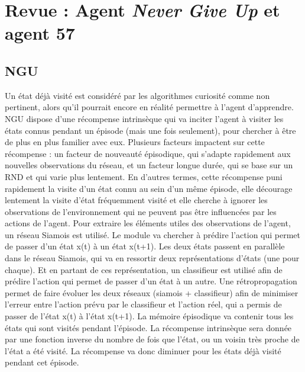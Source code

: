 \documentclass[a4paper,12pt]{report}
\begin{document}
\newpage \section{Revue : Agent \textit{Never Give Up} \cite{ngu} et agent 57 \cite{agent57}}
\subsection{NGU}
Un état déjà visité est considéré par les algorithmes curiosité comme non pertinent, alors qu’il pourrait encore en réalité permettre à l’agent d’apprendre.
\newline
\newline NGU dispose d’une récompense intrinsèque qui va inciter l’agent à visiter les états connus pendant un épisode (mais une fois seulement), pour chercher à être de plus en plus familier avec eux. Plusieurs facteurs impactent sur cette récompense : un facteur de nouveauté épisodique, qui s’adapte rapidement aux nouvelles observations du réseau, et un facteur longue durée, qui se base sur un RND et qui varie plus lentement. En d’autres termes, cette récompense puni rapidement la visite d’un état connu au sein d’un même épisode, elle décourage lentement la visite d’état fréquemment visité et elle cherche à ignorer les observations de l’environnement qui ne peuvent pas être influencées par les actions de l’agent.
\newline
\newline Pour extraire les éléments utiles des observations de l’agent, un réseau Siamois est utilisé. Le module va chercher à prédire l’action qui permet de passer d’un état x(t) à un état x(t+1). Les deux états passent en parallèle dans le réseau Siamois, qui va en ressortir deux représentations d’états (une pour chaque). Et en partant de ces représentation, un classifieur est utilisé afin de prédire l’action qui permet de passer d’un état à un autre. Une rétropropagation permet de faire évoluer les deux réseaux (siamois + classifieur) afin de minimiser l’erreur entre l’action prévu par le classifieur et l’action réel, qui a permis de passer de l'état x(t) à l'état x(t+1).
\newline
\newline La mémoire épisodique va contenir tous les états qui sont visités pendant l’épisode. La récompense intrinsèque sera donnée par une fonction inverse du nombre de fois que l’état, ou un voisin très proche de l’état a été visité. La récompense va donc diminuer pour les états déjà visité pendant cet épisode.
\end{document}
